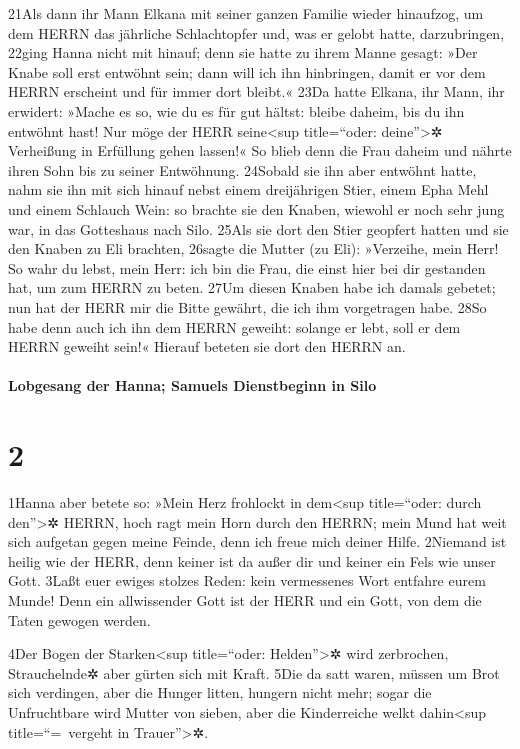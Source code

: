 21Als dann ihr Mann Elkana mit seiner ganzen Familie wieder hinaufzog,
um dem HERRN das jährliche Schlachtopfer und, was er gelobt hatte,
darzubringen, 22ging Hanna nicht mit hinauf; denn sie hatte zu ihrem
Manne gesagt: »Der Knabe soll erst entwöhnt sein; dann will ich ihn
hinbringen, damit er vor dem HERRN erscheint und für immer dort bleibt.«
23Da hatte Elkana, ihr Mann, ihr erwidert: »Mache es so, wie du es für
gut hältst: bleibe daheim, bis du ihn entwöhnt hast! Nur möge der HERR
seine\textless sup title=``oder: deine''\textgreater✲ Verheißung in
Erfüllung gehen lassen!« So blieb denn die Frau daheim und nährte ihren
Sohn bis zu seiner Entwöhnung. 24Sobald sie ihn aber entwöhnt hatte,
nahm sie ihn mit sich hinauf nebst einem dreijährigen Stier, einem Epha
Mehl und einem Schlauch Wein: so brachte sie den Knaben, wiewohl er noch
sehr jung war, in das Gotteshaus nach Silo. 25Als sie dort den Stier
geopfert hatten und sie den Knaben zu Eli brachten, 26sagte die Mutter
(zu Eli): »Verzeihe, mein Herr! So wahr du lebst, mein Herr: ich bin die
Frau, die einst hier bei dir gestanden hat, um zum HERRN zu beten. 27Um
diesen Knaben habe ich damals gebetet; nun hat der HERR mir die Bitte
gewährt, die ich ihm vorgetragen habe. 28So habe denn auch ich ihn dem
HERRN geweiht: solange er lebt, soll er dem HERRN geweiht sein!« Hierauf
beteten sie dort den HERRN an.

\hypertarget{lobgesang-der-hanna-samuels-dienstbeginn-in-silo}{%
\paragraph{Lobgesang der Hanna; Samuels Dienstbeginn in
Silo}\label{lobgesang-der-hanna-samuels-dienstbeginn-in-silo}}

\hypertarget{section-1}{%
\section{2}\label{section-1}}

1Hanna aber betete so: »Mein Herz frohlockt in dem\textless sup
title=``oder: durch den''\textgreater✲ HERRN, hoch ragt mein Horn durch
den HERRN; mein Mund hat weit sich aufgetan gegen meine Feinde, denn ich
freue mich deiner Hilfe. 2Niemand ist heilig wie der HERR, denn keiner
ist da außer dir und keiner ein Fels wie unser Gott. 3Laßt euer ewiges
stolzes Reden: kein vermessenes Wort entfahre eurem Munde! Denn ein
allwissender Gott ist der HERR und ein Gott, von dem die Taten gewogen
werden.

4Der Bogen der Starken\textless sup title=``oder: Helden''\textgreater✲
wird zerbrochen, Strauchelnde✲ aber gürten sich mit Kraft. 5Die da satt
waren, müssen um Brot sich verdingen, aber die Hunger litten, hungern
nicht mehr; sogar die Unfruchtbare wird Mutter von sieben, aber die
Kinderreiche welkt dahin\textless sup title=``=~vergeht in
Trauer''\textgreater✲.

